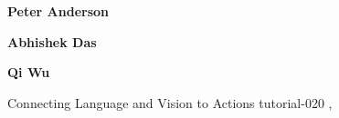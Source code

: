 \begin{bio}
{\bfseries Peter Anderson} 

{\bfseries Abhishek Das} 

{\bfseries Qi Wu} 

\end{bio}

\begin{tutorial}
  {Connecting Language and Vision to Actions}
  {tutorial-020}
  {\daydateyear, \tutorialmorningtime}
  {\TutLocD}

\end{tutorial}
